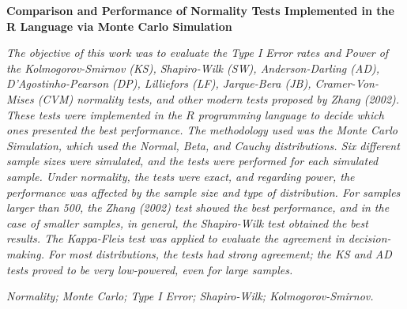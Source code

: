 \documentclass[a4paper,11pt]{article} %
\begin{document}
\begin{center}
    {\large {\bf Comparison and Performance of Normality Tests Implemented in the R Language via Monte Carlo Simulation}\vspace{0.3cm}}
\end{center}
\begin{small}
 {\it 
    The objective of this work was to evaluate the Type I Error rates and Power of the Kolmogorov-Smirnov (KS), Shapiro-Wilk (SW), Anderson-Darling (AD), D’Agostinho-Pearson (DP), Lilliefors (LF), Jarque-Bera (JB), Cramer-Von-Mises (CVM) normality tests, and other modern tests proposed by Zhang (2002). These tests were implemented in the $R$ programming language to decide which ones presented the best performance. The methodology used was the Monte Carlo Simulation, which used the Normal, Beta, and Cauchy distributions. Six different sample sizes were simulated, and the tests were performed for each simulated sample. Under normality, the tests were exact, and regarding power, the performance was affected by the sample size and type of distribution. For samples larger than 500, the Zhang (2002) test showed the best performance, and in the case of smaller samples, in general, the Shapiro-Wilk test obtained the best results. The Kappa-Fleis test was applied to evaluate the agreement in decision-making. For most distributions, the tests had strong agreement; the KS and AD tests proved to be very low-powered, even for large samples.
}
    
\vspace{0.5cm}

  {\it Normality; Monte Carlo; Type I Error; Shapiro-Wilk; Kolmogorov-Smirnov.\vspace{0.3cm}}
\end{small}
\newpage                                                                                   
\pagestyle{fancy}                                                                          
\renewcommand{\thefootnote}{\roman{footnote}}                                              
\lhead{}
\chead{\small \slshape}
\rhead{\thepage}
\lfoot{}
\rfoot{}
\end{document}

